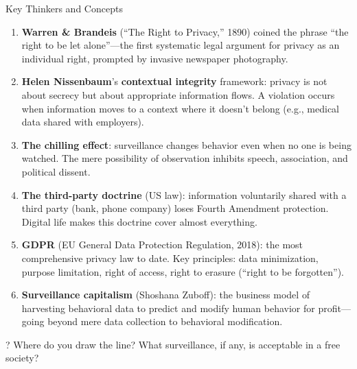 ﻿\documentclass[aspectratio=169,11pt]{beamer}
\begin{document}
\begin{frame}[allowframebreaks]{Key Thinkers and Concepts}
\footnotesize
\begin{enumerate}
    \item \textbf{Warren \& Brandeis} (``The Right to Privacy,'' 1890) coined the phrase ``the right to be let alone''---the first systematic legal argument for privacy as an individual right, prompted by invasive newspaper photography.
    \item \textbf{Helen Nissenbaum}'s \textbf{contextual integrity} framework: privacy is not about secrecy but about appropriate information flows. A violation occurs when information moves to a context where it doesn't belong (e.g., medical data shared with employers).
    \item \textbf{The chilling effect}: surveillance changes behavior even when no one is being watched. The mere possibility of observation inhibits speech, association, and political dissent.
    \item \textbf{The third-party doctrine} (US law): information voluntarily shared with a third party (bank, phone company) loses Fourth Amendment protection. Digital life makes this doctrine cover almost everything.
    \item \textbf{GDPR} (EU General Data Protection Regulation, 2018): the most comprehensive privacy law to date. Key principles: data minimization, purpose limitation, right of access, right to erasure (``right to be forgotten'').
    \item \textbf{Surveillance capitalism} (Shoshana Zuboff): the business model of harvesting behavioral data to predict and modify human behavior for profit---going beyond mere data collection to behavioral modification.
\end{enumerate}

\begin{alertblock}{?}
Where do you draw the line? What surveillance, if any, is acceptable in a free society?
\end{alertblock}
\end{frame}
\end{document}

